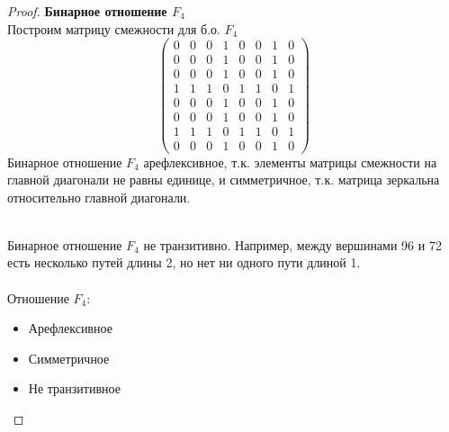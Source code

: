 \begin{proof} \textbf{Бинарное отношение $F_4$}\\
Построим матрицу смежности для б.о. $F_4$
$$ \left( \begin{array}{cccccccc}
		   0 &0 &0 &1 &0 &0 &1 &0 
        \\0 &0 &0 &1 &0 &0 &1 &0 
        \\0 &0 &0 &1 &0 &0 &1 &0 
        \\1 &1 &1 &0 &1 &1 &0 &1 
        \\0 &0 &0 &1 &0 &0 &1 &0 
        \\0 &0 &0 &1 &0 &0 &1 &0 
        \\1 &1 &1 &0 &1 &1 &0 &1 
        \\0 &0 &0 &1 &0 &0 &1 &0 \end{array} \right) $$
Бинарное отношение $F_4$ арефлексивное, т.к. элементы матрицы смежности на главной диагонали не равны единице, и  симметричное, т.к. матрица зеркальна относительно главной диагонали.


\\
Бинарное отношение $F_4$ не транзитивно. Например, между вершинами 96 и 72 есть несколько путей длины 2, но нет ни одного пути длиной 1.
\\ \\
Отношение $F_4$:
\begin{itemize}
    \item Арефлексивное
    \item Симметричное
    \item Не транзитивное
\end{itemize}


\end{proof}
